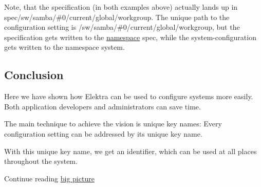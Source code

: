 Note, that the specification (in both examples above) actually lands up in {\ttfamily spec/sw/samba/\#0/current/global/workgroup}. The unique path to the configuration setting is {\ttfamily /sw/samba/\#0/current/global/workgroup}, but the specification gets written to the \hyperlink{doc_tutorials_namespaces_md}{namespace} {\ttfamily spec}, while the system-\/configuration gets written to the namespace {\ttfamily system}.

\subsection*{Conclusion}

Here we have shown how Elektra can be used to configure systems more easily. Both application developers and administrators can save time.

The main technique to achieve the vision is unique key names\+: Every configuration setting can be addressed by its unique key name.

With this unique key name, we get an identifier, which can be used at all places throughout the system.


\begin{DoxyItemize}
\item Continue reading \hyperlink{doc_BIGPICTURE_md}{big picture} 
\end{DoxyItemize}